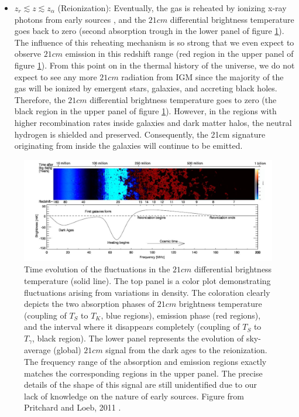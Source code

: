 \documentclass[12pt, TexShade, letterpaper]{report}
\begin{document}
\begin{itemize}
\item $z_r \lesssim z \lesssim z_\alpha$ (Reionization): Eventually, the gas is reheated by ionizing x-ray photons from early sources \cite{21century}, and the $21cm$ differential brightness temperature goes back to zero (second absorption trough in the lower panel of figure \ref{fig:global_signal_pritchard_loeb}). The influence of this reheating mechanism is so strong that we even expect to observe $21cm$ emission in this redshift range (red region in the upper panel of figure \ref{fig:global_signal_pritchard_loeb}). From this point on in the thermal history of the universe, we do not expect to see any more $21cm$ radiation from IGM since the majority of the gas will be ionized by emergent stars, galaxies, and accreting black holes. Therefore, the $21cm$ differential brightness temperature goes to zero (the black region in the upper panel of figure \ref{fig:global_signal_pritchard_loeb}). However, in the regions with higher recombination rates inside galaxies and dark matter halos, the neutral hydrogen is shielded and preserved. Consequently, the 21cm signature originating from inside the galaxies will continue to be emitted\cite{map_universe, 21century}.\par
\end{itemize}
\begin{figure}[h!]

\centering
\includegraphics[scale =0.8]{global_signal_pritchard_loeb.jpg}
\caption[Time evolution of the fluctuations in the $21cm$ differential brightness temperature]{Time evolution of the fluctuations in the $21cm$ differential brightness temperature (solid line). The top panel is a color plot demonstrating fluctuations arising from variations in density. The coloration clearly depicts the two absorption phases of $21cm$ brightness temperature (coupling of $T_S$ to $T_K$, blue regions), emission phase (red regions), and the interval where it disappears completely (coupling of $T_S$ to $T_\gamma$, black region). The lower panel represents the evolution of sky-average (global) $21cm$ signal from the dark ages to the reionization. The frequency range of the absorption and emission regions exactly matches the corresponding regions in the upper panel. The precise details of the shape of this signal are still unidentified due to our lack of knowledge on the nature of early sources\cite{liu2013global}. Figure from Pritchard and Loeb, 2011 \cite{21century}.}
\label{fig:global_signal_pritchard_loeb}
\end{figure}
\end{document}
